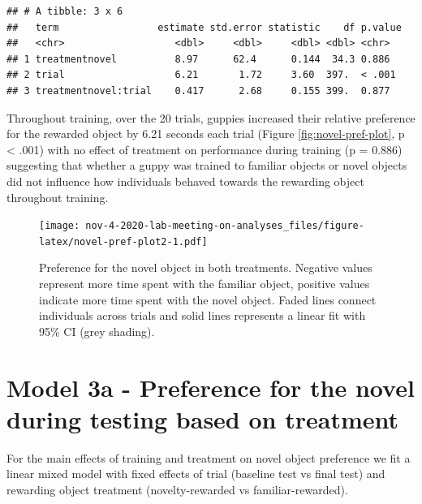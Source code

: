 \documentclass[]{book}
\newenvironment{Shaded}{\begin{snugshade}}{\end{snugshade}}
\newcommand{\KeywordTok}[1]{\textcolor[rgb]{0.13,0.29,0.53}{\textbf{#1}}}
\newcommand{\DataTypeTok}[1]{\textcolor[rgb]{0.13,0.29,0.53}{#1}}
\newcommand{\DecValTok}[1]{\textcolor[rgb]{0.00,0.00,0.81}{#1}}
\newcommand{\StringTok}[1]{\textcolor[rgb]{0.31,0.60,0.02}{#1}}
\newcommand{\OperatorTok}[1]{\textcolor[rgb]{0.81,0.36,0.00}{\textbf{#1}}}
\newcommand{\NormalTok}[1]{#1}
\begin{document}
\begin{verbatim}
## # A tibble: 3 x 6
##   term                 estimate std.error statistic    df p.value
##   <chr>                   <dbl>     <dbl>     <dbl> <dbl> <chr>  
## 1 treatmentnovel          8.97      62.4      0.144  34.3 0.886  
## 2 trial                   6.21       1.72     3.60  397.  < .001 
## 3 treatmentnovel:trial    0.417      2.68     0.155 399.  0.877
\end{verbatim}

Throughout training, over the 20 trials, guppies increased their
relative preference for the rewarded object by 6.21 seconds each trial
(Figure \ref{fig:novel-pref-plot}, p \textless{} .001) with no effect of
treatment on performance during training (p = 0.886) suggesting that
whether a guppy was trained to familiar objects or novel objects did not
influence how individuals behaved towards the rewarding object
throughout training.

\begin{figure}
\centering
\texttt{[image: nov-4-2020-lab-meeting-on-analyses\_files/figure-latex/novel-pref-plot2-1.pdf]}
\caption{\label{fig:novel-pref-plot2}Preference for the novel object in both
treatments. Negative values represent more time spent with the familiar
object, positive values indicate more time spent with the novel object.
Faded lines connect individuals across trials and solid lines represents
a linear fit with 95\% CI (grey shading).}
\end{figure}

\chapter{Model 3a - Preference for the novel during testing based on
treatment}\label{model-3a---preference-for-the-novel-during-testing-based-on-treatment}

For the main effects of training and treatment on novel object
preference we fit a linear mixed model with fixed effects of trial
(baseline test vs final test) and rewarding object treatment
(novelty-rewarded vs familiar-rewarded).

\begin{Shaded}
\end{Shaded}
\end{document}
